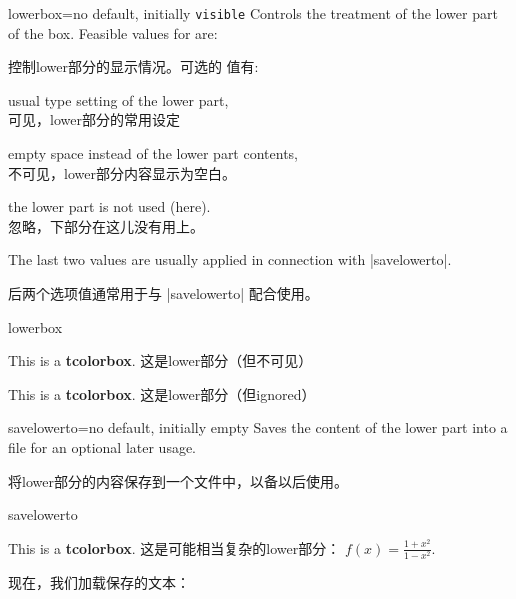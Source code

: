 \begin{docTcbKey}{lowerbox}{=}{no default, initially \texttt{visible}}
Controls the treatment of the lower part of the box.
Feasible values for  are:

控制lower部分的显示情况。可选的  值有:
\begin{DescriptionL}{}
\item[\docValue{visible}]usual type setting of the lower part,
\\可见，lower部分的常用设定

\item[\docValue{invisible}]empty space instead of the lower part contents,
\\不可见，lower部分内容显示为空白。

\item[\docValue{ignored}]the lower part is not used (here).
\\忽略，下部分在这儿没有用上。
\end{DescriptionL}

The last two values are usually applied in connection with |savelowerto|.

后两个选项值通常用于与 |savelowerto| 配合使用。

\begin{exdispExample}{lowerbox}
\begin{tcolorbox}[lowerbox=invisible,colback=white]
This is a \textbf{tcolorbox}.
\tcblower
这是lower部分（但不可见）
\end{tcolorbox}

\begin{tcolorbox}[lowerbox=ignored,colback=white]
This is a \textbf{tcolorbox}.
\tcblower
这是lower部分（但ignored）
\end{tcolorbox}
\end{exdispExample}
\end{docTcbKey}


\begin{docTcbKey}[][doc updated=2014-11-28]{savelowerto}{=}{no default, initially empty}
Saves the content of the lower part into a file for an optional later usage.

将lower部分的内容保存到一个文件中，以备以后使用。
\begin{exdispExample}{savelowerto}
\begin{tcolorbox}[lowerbox=invisible,savelowerto=\jobname_bspsave.tex,colback=white]
This is a \textbf{tcolorbox}.
\tcblower
这是可能相当复杂的lower部分：
$\displaystyle f(x)=\frac{1+x^2}{1-x^2}$.
\end{tcolorbox}

现在，我们加载保存的文本：\\

\end{exdispExample}
\end{docTcbKey}



